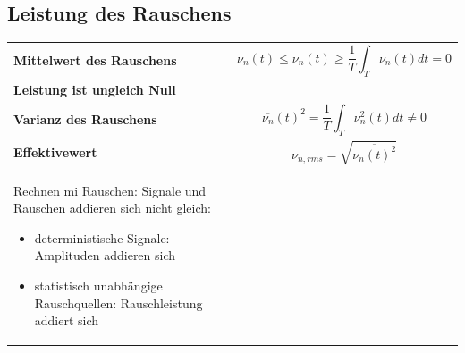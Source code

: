 \subsection{Leistung des Rauschens}
\begin{tabular}{ll}
\textbf{Mittelwert des Rauschens}&
\begin{minipage}{9cm}
\begin{equation}
\overline{\nu_{n}}(t)\leq \nu_{n}(t)\geq \frac{1}{T}\int_{T}\nu_{n}(t)dt=0
\end{equation}
\end{minipage}
\\
\textbf{Leistung ist ungleich Null}&\\
\textbf{Varianz des Rauschens}&
\begin{minipage}{9cm}
\begin{equation}
\overline{\nu_{n}}(t)^2=\frac{1}{T}\int_{T}\nu^2_{n}(t)dt\neq0
\end{equation}
\end{minipage}
\\
\textbf{Effektivewert}&
\begin{minipage}{9cm}
\begin{equation}
\nu_{n,rms}=\sqrt{\overline{\nu_{n}(t)^2}}
\end{equation}
\end{minipage}
\\
\begin{minipage}{9cm}
Rechnen mi Rauschen: Signale und Rauschen addieren sich nicht gleich:
\begin{itemize}
  \item deterministische Signale: Amplituden addieren sich
  \item statistisch unabhängige Rauschquellen: Rauschleistung addiert sich
\end{itemize}
\end{minipage}
&
\\
\end{tabular}

